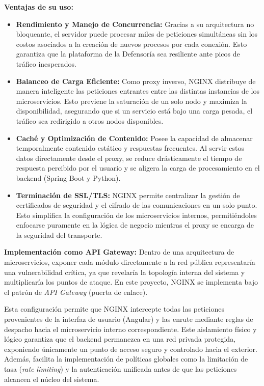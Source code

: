 \textbf{Ventajas de su uso:}
\begin{itemize}
\item \textbf{Rendimiento y Manejo de Concurrencia:} Gracias a su arquitectura no bloqueante, el servidor puede procesar miles de peticiones simultáneas sin los costos asociados a la creación de nuevos procesos por cada conexión. Esto garantiza que la plataforma de la Defensoría sea resiliente ante picos de tráfico inesperados.

\item \textbf{Balanceo de Carga Eficiente:} Como proxy inverso, NGINX distribuye de manera inteligente las peticiones entrantes entre las distintas instancias de los microservicios. Esto previene la saturación de un solo nodo y maximiza la disponibilidad, asegurando que si un servicio está bajo una carga pesada, el tráfico sea redirigido a otros nodos disponibles.

\item \textbf{Caché y Optimización de Contenido:} Posee la capacidad de almacenar temporalmente contenido estático y respuestas frecuentes. Al servir estos datos directamente desde el proxy, se reduce drásticamente el tiempo de respuesta percibido por el usuario y se aligera la carga de procesamiento en el backend (Spring Boot y Python).

\item \textbf{Terminación de SSL/TLS:} NGINX permite centralizar la gestión de certificados de seguridad y el cifrado de las comunicaciones en un solo punto. Esto simplifica la configuración de los microservicios internos, permitiéndoles enfocarse puramente en la lógica de negocio mientras el proxy se encarga de la seguridad del transporte.

\end{itemize}

\textbf{Implementación como API Gateway:}
Dentro de una arquitectura de microservicios, exponer cada módulo directamente a la red pública representaría una vulnerabilidad crítica, ya que revelaría la topología interna del sistema y multiplicaría los puntos de ataque. En este proyecto, NGINX se implementa bajo el patrón de \textit{API Gateway} (puerta de enlace).

Esta configuración permite que NGINX intercepte todas las peticiones provenientes de la interfaz de usuario (Angular) y las enrute mediante reglas de despacho hacia el microservicio interno correspondiente. Este aislamiento físico y lógico garantiza que el backend permanezca en una red privada protegida, exponiendo únicamente un punto de acceso seguro y controlado hacia el exterior. Además, facilita la implementación de políticas globales como la limitación de tasa (\textit{rate limiting}) y la autenticación unificada antes de que las peticiones alcancen el núcleo del sistema.

